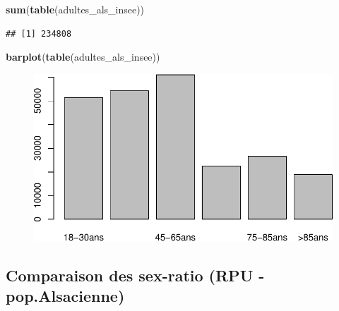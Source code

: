 \documentclass[]{article}
\newenvironment{Shaded}{\begin{snugshade}}{\end{snugshade}}
\newcommand{\KeywordTok}[1]{\textcolor[rgb]{0.13,0.29,0.53}{\textbf{{#1}}}}
\newcommand{\NormalTok}[1]{{#1}}
\begin{document}
\begin{Shaded}
\begin{Highlighting}[]
\KeywordTok{sum}\NormalTok{(}\KeywordTok{table}\NormalTok{(adultes_als_insee))}
\end{Highlighting}
\end{Shaded}

\begin{verbatim}
## [1] 234808
\end{verbatim}

\begin{Shaded}
\begin{Highlighting}[]
\KeywordTok{barplot}\NormalTok{(}\KeywordTok{table}\NormalTok{(adultes_als_insee))}
\end{Highlighting}
\end{Shaded}

\begin{figure}[htbp]
\centering
\includegraphics{./age_files/figure-latex/tranches_age_als-1.pdf}
\end{figure}

\subsection{Comparaison des sex-ratio (RPU -
pop.Alsacienne)}\label{comparaison-des-sex-ratio-rpu---pop.alsacienne}
\end{document}
